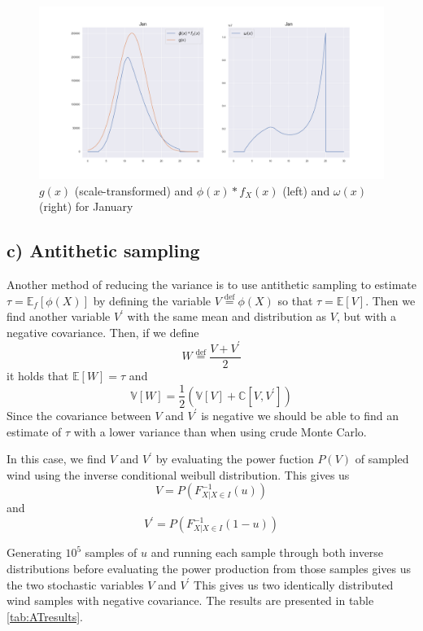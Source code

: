 \documentclass[a4paper]{article}
\begin{document}
\begin{figure}[H]
    \centering
    \includegraphics[width = 1.0\textwidth]{images/janISMC}
    \caption{$g(x)$ (scale-transformed) and $\phi(x)*f_X(x)$ (left) and $\omega(x)$ (right) for January}
    \label{fig:ISMCjan}
\end{figure}

\subsection*{c) Antithetic sampling}
Another method of reducing the variance is to use antithetic sampling to estimate $\tau = \mathbb{E}_f[\phi (X)]$ by defining the variable $V \overset{\mathrm{def}}{=} \phi (X)$ so that $\tau = \mathbb{E}[V]$. Then we find another variable $V^\prime$ with the same mean and distribution as $V$, but with a negative covariance. Then, if we define $$W \overset{\mathrm{def}}{=} \frac{V + V^\prime}{2}$$ it holds that $\mathbb{E}[W] = \tau$ and $$\mathbb{V}[W] = \frac{1}{2}(\mathbb{V}[V] + \mathbb{C}[V, V^\prime])$$Since the covariance between $V$ and $V^\prime$ is negative we should be able to find an estimate of $\tau$ with a lower variance than when using crude Monte Carlo.

In this case, we find $V$ and $V^\prime$ by evaluating the power fuction $P(V)$ of sampled wind using the inverse conditional weibull distribution. This gives us
\begin{equation}
    V = P(F_{X|X\in I}^{-1}(u))
\end{equation}
and
\begin{equation}
    V^\prime = P(F_{X|X\in I}^{-1}(1-u))
\end{equation}

Generating $10^5$ samples of $u$ and running each sample through both inverse distributions before evaluating the power production from those samples gives us the two stochastic variables $V$ and $V^\prime$ This gives us two identically distributed wind samples with negative covariance. The results are presented in table \ref{tab:ATresults}.
\end{document}
